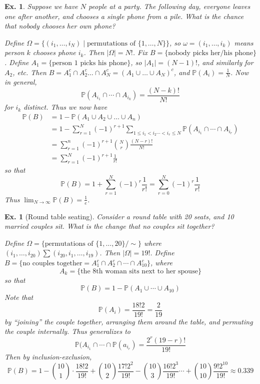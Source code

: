 \documentclass[12pt, a4paper]{book}
\renewcommand{\Pr}{\mathbb{P}}
\newtheorem{example}[theorem]{Ex.}
\theoremstyle{nonumberplain}
\begin{document}
\begin{example}
    Suppose we have $N$ people at a party.
    The following day, everyone leaves one after another, and chooses a single phone from a pile.
    What is the chance that nobody chooses her own phone?

    Define $\Omega=\{(i_1,\ldots,i_N)\mid\text{permutations of }\{1,\ldots,N\}\}$, so $\omega=(i_1,\ldots,i_k)$ means person $k$ chooses phone $i_k$.
    Then $|\Omega|=N!$.
    Fix $B=\{\text{nobody picks her/his phone}\}$.
    Define $A_1=\{\text{person 1 picks his phone}\}$, so $|A_1|=(N-1)!$, and similarly for $A_2$, etc.
    Then $B=A_1^c\cap A_2^c\ldots\cap A_N^c=(A_1\cup \ldots\cup A_N)^c$, and $\mathbb{P}(A_i)=\frac{1}{N}$.
    Now in general,
    \[\Pr(A_{i_1}\cap\cdots\cap A_{i_k})=\frac{(N-k)!}{N!}\]
    for $i_k$ distinct.
    Thus we now have
    \begin{align*}
        \Pr(B) &= 1-\Pr(A_1\cup A_2\cup\ldots\cup A_n)\\
               &= 1-\sum\limits_{r=1}^N(-1)^{r+1}\sum\limits_{1\leq i_1<i_2\cdots<i_r\leq N}\Pr(A_{i_1}\cap\cdots\cap A_{i_r})\\
                      &= \sum\limits_{r=1}^n(-1)^{r+1}\binom{N}{r}\frac{(N-r)!}{N!}\\
                      &= \sum\limits_{r=1}^N(-1)^{r+1}\frac{1}{r!}
    \end{align*}
    so that
    \[\Pr(B)=1+\sum\limits_{r=1}^N(-1)^r\frac{1}{r!}=\sum\limits_{r=0}^N(-1)^r\frac{1}{r!}\]
    Thus $\lim_{N\to\infty}\Pr(B)=\frac{1}{e}$.
\end{example}
\begin{example}[Round table seating]
    Consider a round table with 20 seats, and 10 married couples sit.
    What is the change that no couples sit together?

    Define $\Omega=\{\text{permutations of }\{1,\ldots,20\}/\sim\}$ where $(i_1,\ldots,i_{20})\sum(i_{20},i_1,\ldots,i_{19})$.
    Then $|\Omega|=19!$.
    Define $B=\{\text{no couples together}=A_1^c\cap A_2^c\cap\cdots\cap A_{10}^c\}$, where
    \[A_k=\{\text{the 8th woman sits next to her spouse}\}\]
    so that
    \[\Pr(B)=1-\Pr(A_1\cup\cdots\cup A_{10})\]
    Note that
    \[\Pr(A_i)=\frac{18!2}{19!}=\frac{2}{19}\]
    by ``joining'' the couple together, arranging them around the table, and permuting the couple internally.
    Thus generalizes to
    \[\Pr(A_{i_1}\cap\cdots\cap \Pr(a_{i_r})=\frac{2^r(19-r)!}{19!}\]
    Then by inclusion-exclusion,
    \[\Pr(B)=1-\binom{10}{1}\cdot\frac{18!2}{19!}+\binom{10}{2}\frac{17!2^2}{19!}-\binom{10}{3}\frac{16!2^3}{19!}\cdots+\binom{10}{10}\frac{9!2^{10}}{19!}\approx 0.339\]
\end{example}
\end{document}
